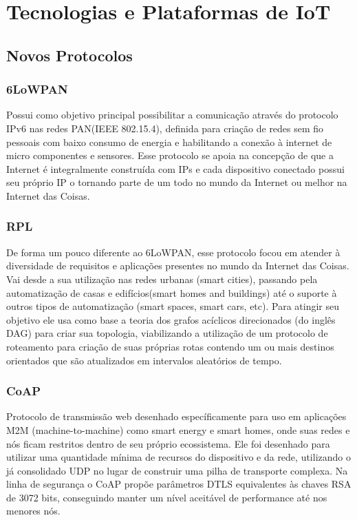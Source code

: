\chapter{Tecnologias e Plataformas de IoT}

\section{Novos Protocolos}
\subsection{6LoWPAN}
Possui como objetivo principal possibilitar a comunica\c{c}\~ao atrav\'es do protocolo IPv6 nas redes PAN(IEEE 802.15.4), definida para cria\c{c}\~ao de redes sem fio pessoais com baixo consumo de energia e habilitando a conex\~ao \`a internet de micro componentes e sensores. Esse protocolo se apoia na concep\c{c}\~ao de que a Internet \'e integralmente constru\'ida com IPs e cada dispositivo conectado possui seu pr\'oprio IP o tornando parte de um todo no mundo da Internet ou melhor na Internet das Coisas.
\subsection{RPL}
De forma um pouco diferente ao 6LoWPAN, esse protocolo focou em atender \`a diversidade de requisitos e aplica\c{c}\~oes presentes no mundo da Internet das Coisas. Vai desde a sua utiliza\c{c}\~ao nas redes urbanas (smart cities), passando pela automatiza\c{c}\~ao de casas e edif\'icios(smart homes and buildings) at\'e o suporte \`a outros tipos de automatiza\c{c}\~ao (smart spaces, smart cars, etc). Para atingir seu objetivo ele usa como base a teoria dos grafos ac\'iclicos direcionados (do ingl\^es DAG) para criar sua topologia, viabilizando a utiliza\c{c}\~ao de um protocolo de roteamento para cria\c{c}\~ao de suas pr\'oprias rotas contendo um ou mais destinos orientados que s\~ao atualizados em intervalos aleat\'orios de tempo.
\subsection{CoAP}
Protocolo de transmiss\~ao web desenhado espec\'ificamente para uso em aplica\c{c}\~oes M2M (machine-to-machine) como smart energy e smart homes, onde suas redes e n\'os ficam restritos dentro de seu pr\'oprio ecossistema. Ele foi desenhado para utilizar uma quantidade m\'inima de recursos do dispositivo e da rede, utilizando o j\'a consolidado UDP no lugar de construir uma pilha de transporte complexa. Na linha de seguran\c{c}a o CoAP prop\~oe par\^ametros DTLS equivalentes \`as chaves RSA de 3072 bits, conseguindo manter um n\'ivel aceit\'avel de performance at\'e nos menores n\'os.
